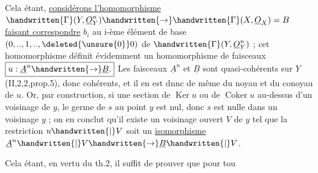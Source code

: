 Cela étant, \uline{considérons l'homomorphisme} $\handwritten{\Gamma}(Y,\underline O_Y^n)\handwritten{\to}\handwritten{\Gamma}(X,\underline O_X)=B$ \uline{faisant correspondre}
$b_i$ au i-ème élément de base $(0,..,1,..,\deleted{\unsure{0}}0)$ de $\handwritten{\Gamma}(Y,\underline O_Y^n)$ ; cet homomorphisme définit évidemment un homomorphisme de faisceaux $\boxed{u:\underline A^n\handwritten{\to}\underline B.}$  Les faisceaux $\underline A^n$ et $\underline B$ sont quasi-cohérents sur $Y$ (II,2,2,prop.5), donc cohérents, et il en est dnnc de même du noyau et du conoyau de $u$. Or, par construction, si  une section de $\operatorname{Ker}u$ ou de $\operatorname{Coker}u$ au-dessus d'un voisinage de $y$, le germe de $s$ au point $y$ est nul, donc $s$ est nulle dans un voisinage $y$ ; on en conclut qu'il existe un voisinage ouvert $V$ de $y$ tel que la restriction $u\handwritten{\vert}V$ soit un \uline{isomorphisme} $\underline A^n\handwritten{\vert}V\handwritten{\to}\underline B\handwritten{\vert}V$.

Cela étant, en vertu du th.2, il suffit de prouver que pour tou
